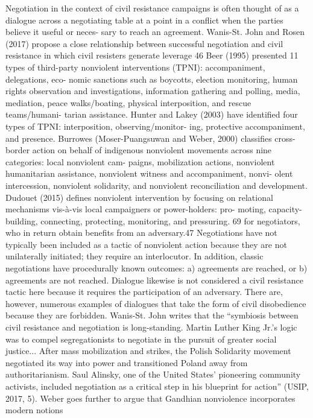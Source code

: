 \documentclass[twoside,a4paper,12pt,fleqn,openany]{extbook}
\begin{document}
Negotiation in the context of civil resistance campaigns is often thought of as a dialogue
across a negotiating table at a point in a conflict when the parties believe it useful or neces-
sary to reach an agreement. Wanis-St. John and Rosen (2017) propose a close relationship
between successful negotiation and civil resistance in which civil resisters generate leverage
46
Beer (1995) presented 11 types of third-party nonviolent interventions (TPNI): accompaniment, delegations, eco-
nomic sanctions such as boycotts, election monitoring, human rights observation and investigations, information
gathering and polling, media, mediation, peace walks/boating, physical interposition, and rescue teams/humani-
tarian assistance. Hunter and Lakey (2003) have identified four types of TPNI: interposition, observing/monitor-
ing, protective accompaniment, and presence. Burrowes (Moser-Puangsuwan and Weber, 2000) classifies
cross-border action on behalf of indigenous nonviolent movements across nine categories: local nonviolent cam-
paigns, mobilization actions, nonviolent humanitarian assistance, nonviolent witness and accompaniment, nonvi-
olent intercession, nonviolent solidarity, and nonviolent reconciliation and development. Dudouet (2015) defines
nonviolent intervention by focusing on relational mechanisms vis-à-vis local campaigners or power-holders: pro-
moting, capacity-building, connecting, protecting, monitoring, and pressuring.
69
for negotiators, who in return obtain benefits from an adversary.47 Negotiations have not
typically been included as a tactic of nonviolent action because they are not unilaterally
initiated; they require an interlocutor. In addition, classic negotiations have procedurally
known outcomes: a) agreements are reached, or b) agreements are not reached. Dialogue
likewise is not considered a civil resistance tactic here because it requires the participation
of an adversary. There are, however, numerous examples of dialogues that take the form of
civil disobedience because they are forbidden.
Wanis-St. John writes that the “symbiosis between civil resistance and negotiation is
long-standing. Martin Luther King Jr.’s logic was to compel segregationists to negotiate in the
pursuit of greater social justice... After mass mobilization and strikes, the Polish Solidarity
movement negotiated its way into power and transitioned Poland away from authoritarianism.
Saul Alinsky, one of the United States’ pioneering community activists, included negotiation
as a critical step in his blueprint for action” (USIP, 2017, 5).
Weber goes further to argue that Gandhian nonviolence incorporates modern notions
\end{document}
